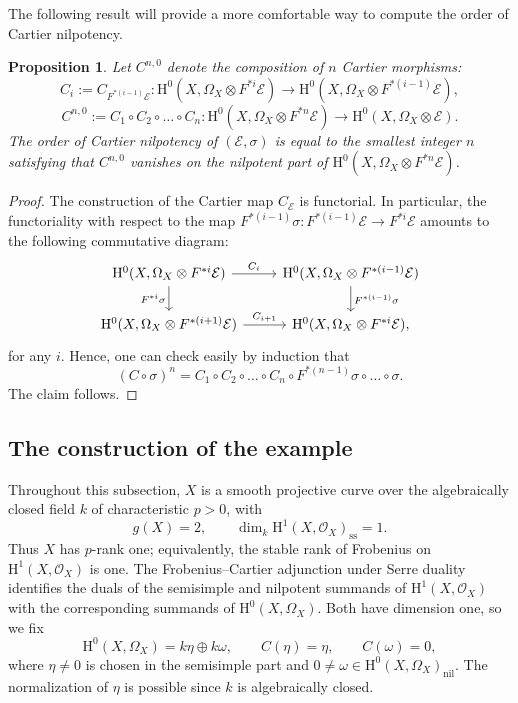 \documentclass[12pt,a4]{amsart}
\newtheorem{prop}[claim]{Proposition}
\theoremstyle{definition}
\begin{document}
The following result will provide a more comfortable way to compute the order of Cartier nilpotency.
\begin{prop} \label{proposition 5.6} Let $C^{n,0}$ denote the composition of $n$ Cartier morphisms:
$$C_i:=C_{F^{*(i-1)} \mathcal E}: \mathrm{H}^0(X,\Omega_X \otimes F^{*i} \mathcal E) \rightarrow \mathrm{H}^0(X,\Omega_X \otimes F^{*(i-1)}\mathcal E),$$ 
$$C^{n,0}:=C_1\circ C_2\circ\ldots\circ C_n:\mathrm{H}^0(X,\Omega_X \otimes F^{*n} \mathcal E) \rightarrow \mathrm{H}^0(X,\Omega_X \otimes \mathcal E).$$
The order of Cartier nilpotency of $(\mathcal E,\sigma)$ is equal to 
the smallest integer $n$ satisfying that $C^{n,0}$ vanishes on the nilpotent part of
$\mathrm{H}^0(X,\Omega_X \otimes F^{*n} \mathcal E)$.
\end{prop}
\begin{proof}  The construction of the Cartier map $C_\mathcal{E}$ is
functorial. In particular, the functoriality with respect to the map
$F^{*(i-1)}\sigma: F^{*(i-1)}\mathcal E\longrightarrow F^{*i}\mathcal E$ amounts
to the following commutative diagram: 
\begin{equation} \label{commutative diagram} \begin{tikzcd}
\mathrm{H}^0(X,\Omega_X \otimes F^{*i}\mathcal E) \arrow{r}{C_i} \arrow[swap]{d}{F^{*i}\sigma} 
& \mathrm{H}^0(X,\Omega_X \otimes F^{*(i-1)}\mathcal E) \arrow{d}{F^{*(i-1)}\sigma} \\%
\mathrm{H}^0(X,\Omega_X \otimes F^{*(i+1)}\mathcal E) \arrow{r}{C_{i+1}}& 
\mathrm{H}^0(X,\Omega_X \otimes F^{*i}\mathcal E),
\end{tikzcd}
\end{equation}
for any $i.$ Hence, one can check easily by induction that
$$(C\circ \sigma)^n= C_1\circ C_2\circ\ldots\circ C_n\circ F^{*(n-1)}\sigma\circ
\ldots\circ \sigma.$$
The claim follows. 
\end{proof}
 

\subsection{The construction of the example}\label{sec:construction-example}
Throughout this subsection, $X$ is a smooth projective curve over the
algebraically closed field $k$ of characteristic $p>0$, with
\begin{equation*}\tag{A}\label{assumption_genus_two}
g(X)=2,\qquad
\dim_k\mathrm H^1(X,\mathcal O_X)_\mathrm{ss}=1.
\end{equation*}
Thus $X$ has $p$-rank one; equivalently, the stable rank of Frobenius on
$\mathrm H^1(X,\mathcal O_X)$ is one.
The Frobenius--Cartier adjunction under Serre duality identifies the duals
of the semisimple and nilpotent summands of $\mathrm H^1(X,\mathcal O_X)$
with the corresponding summands of $\mathrm H^0(X,\Omega_X)$.
Both have dimension one, so we fix
\[
\mathrm H^0(X,\Omega_X)=k\eta\oplus k\omega,
\qquad C(\eta)=\eta,\qquad C(\omega)=0,
\]
where $\eta\ne0$ is chosen in the semisimple part and
$0\ne\omega\in\mathrm H^0(X,\Omega_X)_\mathrm{nil}$.
The normalization of $\eta$ is possible since $k$ is algebraically closed.
\end{document}
